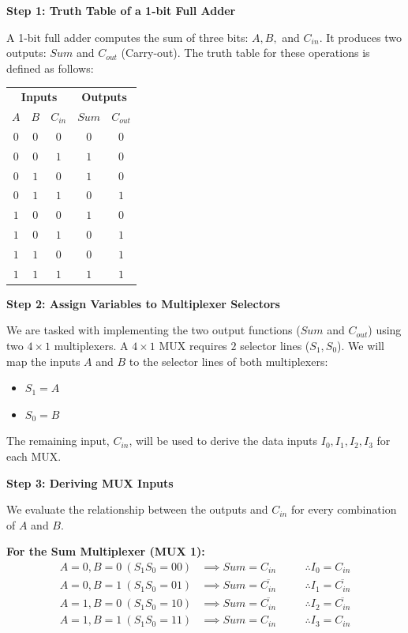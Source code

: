 \documentclass[12pt,a3paper]{article}
\begin{document}
\begin{enumerate}
\begin{tcolorbox}[enhanced,breakable,ansbox,colback=cD!4,colframe=cD,boxrule=0.8pt,arc=5pt,title={\textbf{Answer}},fonttitle=\bfseries\color{white},colbacktitle=cD]
\textbf{Step 1: Truth Table of a 1-bit Full Adder}

A 1-bit full adder computes the sum of three bits: $A, B,$ and $C_{in}$. It produces two outputs: $Sum$ and $C_{out}$ (Carry-out). The truth table for these operations is defined as follows:

\begin{center}
\renewcommand{\arraystretch}{1.2}
\begin{tabular}{ccc|cc}
\toprule
\multicolumn{3}{c|}{\textbf{Inputs}} & \multicolumn{2}{c}{\textbf{Outputs}} \\
$A$ & $B$ & $C_{in}$ & $Sum$ & $C_{out}$ \\
\midrule
$0$ & $0$ & $0$ & $0$ & $0$ \\
$0$ & $0$ & $1$ & $1$ & $0$ \\
\midrule
$0$ & $1$ & $0$ & $1$ & $0$ \\
$0$ & $1$ & $1$ & $0$ & $1$ \\
\midrule
$1$ & $0$ & $0$ & $1$ & $0$ \\
$1$ & $0$ & $1$ & $0$ & $1$ \\
\midrule
$1$ & $1$ & $0$ & $0$ & $1$ \\
$1$ & $1$ & $1$ & $1$ & $1$ \\
\bottomrule
\end{tabular}
\end{center}

\textbf{Step 2: Assign Variables to Multiplexer Selectors}

We are tasked with implementing the two output functions ($Sum$ and $C_{out}$) using two $4\times1$ multiplexers. 
A $4\times1$ MUX requires $2$ selector lines ($S_1, S_0$). We will map the inputs $A$ and $B$ to the selector lines of both multiplexers:
\begin{itemize}
    \item $S_1 = A$
    \item $S_0 = B$
\end{itemize}
The remaining input, $C_{in}$, will be used to derive the data inputs $I_0, I_1, I_2, I_3$ for each MUX.

\vspace{0.5cm}
\textbf{Step 3: Deriving MUX Inputs}

We evaluate the relationship between the outputs and $C_{in}$ for every combination of $A$ and $B$.

\textbf{For the Sum Multiplexer (MUX 1):}
\begin{align*}
    A=0, B=0 \ (S_1 S_0 = 00) &\implies Sum = C_{in} \quad &&\therefore I_0 = C_{in} \\
    A=0, B=1 \ (S_1 S_0 = 01) &\implies Sum = \overline{C_{in}} \quad &&\therefore I_1 = \overline{C_{in}} \\
    A=1, B=0 \ (S_1 S_0 = 10) &\implies Sum = \overline{C_{in}} \quad &&\therefore I_2 = \overline{C_{in}} \\
    A=1, B=1 \ (S_1 S_0 = 11) &\implies Sum = C_{in} \quad &&\therefore I_3 = C_{in}
\end{align*}


\end{tcolorbox}
\end{enumerate}
\end{document}
